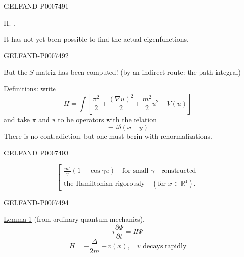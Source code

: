 \begin{GelfandAdjacentEvidence}{GELFAND-P000749}{1}

\underline{II.} .

It has not yet been possible to find the actual eigenfunctions.
\end{GelfandAdjacentEvidence}
\begin{GelfandAdjacentEvidence}{GELFAND-P000749}{2}

 But the \(S\)-matrix has been computed! (by an indirect route: the path integral)

Definitions: write
\begin{equation*}
H=\int\left[\frac{\pi^2}{2}+\frac{(\nabla u)^2}{2}+\frac{m^2}{2}u^2+V(u)\right]
\tag{25}
\end{equation*}
and take \(\pi\) and \(u\) to be operators with the relation
\begin{equation*}
[\hat\pi(x),\hat u(y)]=i\delta(x-y)
\tag{26}
\end{equation*}
There is no contradiction, but one must begin with renormalizations.


\end{GelfandAdjacentEvidence}
\begin{GelfandAdjacentEvidence}{GELFAND-P000749}{3}

\[
\left[\begin{gathered}
\frac{m^2}{\gamma}(1-\cos\gamma u)\quad\text{for small }\gamma\quad\text{constructed}\\
\text{the Hamiltonian rigorously}\quad(\text{for }x\in\mathbb R^1).
\end{gathered}\right.
\]
\end{GelfandAdjacentEvidence}
\begin{GelfandAdjacentEvidence}{GELFAND-P000749}{4}


\underline{Lemma 1} (from ordinary quantum mechanics). 
\begin{equation*}
i\frac{\partial\Psi}{\partial t}=H\Psi
\tag{27}
\end{equation*}
\begin{equation*}
H=-\frac{\Delta}{2m}+v(x),\quad v\text{ decays rapidly}
\tag{28}
\end{equation*}
\end{GelfandAdjacentEvidence}

